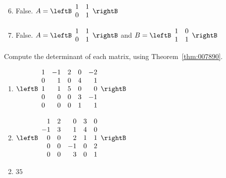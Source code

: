 \begin{multicols}{2}
\begin{ex}
\begin{sol}
\begin{enumerate}[label={\alph*.}]
\setcounter{enumi}{5}
\item  False. $A = \leftB \begin{array}{rr}
1 & 1 \\
0 & 1 
\end{array} \rightB$ 


\setcounter{enumi}{7}
\item  False. $A = \leftB \begin{array}{rr}
1 & 1 \\
0 & 1 
\end{array} \rightB$ 
 and $B = \leftB \begin{array}{rr}
1 & 0 \\
1 & 1 
\end{array} \rightB$ 


\end{enumerate}
\end{sol}
\end{ex}


\begin{ex}
Compute the determinant of each matrix, using Theorem~\ref{thm:007890}.


\begin{enumerate}[label={\alph*.}]
\item $\leftB \begin{array}{rrrrr}
1 & -1 & 2 & 0 & -2 \\
0 & 1 & 0 & 4 & 1 \\
1 & 1 & 5 & 0 & 0 \\
0 & 0 & 0 & 3 & -1 \\
0 & 0 & 0 & 1 & 1 
\end{array}
\rightB$

\item $\leftB \begin{array}{rrrrr}
1 & 2 & 0 & 3 & 0 \\
-1 & 3 & 1 & 4 & 0 \\
0 & 0 & 2 & 1 & 1 \\
0 & 0 & -1 & 0 & 2 \\
0 & 0 & 3 & 0 & 1 
\end{array}
\rightB$


\end{enumerate}
\begin{sol}
\begin{enumerate}[label={\alph*.}]
\setcounter{enumi}{1}
\item  $35$

\end{enumerate}
\end{sol}
\end{ex}


\end{multicols}
